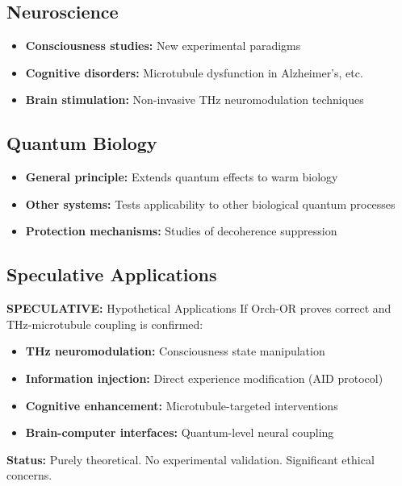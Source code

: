 \subsection{Neuroscience}

\begin{itemize}
\item \textbf{Consciousness studies:} New experimental paradigms
\item \textbf{Cognitive disorders:} Microtubule dysfunction in Alzheimer's, etc.
\item \textbf{Brain stimulation:} Non-invasive THz neuromodulation techniques
\end{itemize}

\subsection{Quantum Biology}

\begin{itemize}
\item \textbf{General principle:} Extends quantum effects to warm biology
\item \textbf{Other systems:} Tests applicability to other biological quantum processes
\item \textbf{Protection mechanisms:} Studies of decoherence suppression
\end{itemize}

\subsection{Speculative Applications}

\begin{calloutbox}[colback=red!5!white,colframe=red!75!black]{\textbf{SPECULATIVE:} Hypothetical Applications}
If Orch-OR proves correct and THz-microtubule coupling is confirmed:
\begin{itemize}
\item \textbf{THz neuromodulation:} Consciousness state manipulation
\item \textbf{Information injection:} Direct experience modification (AID protocol)
\item \textbf{Cognitive enhancement:} Microtubule-targeted interventions
\item \textbf{Brain-computer interfaces:} Quantum-level neural coupling
\end{itemize}

\textbf{Status:} Purely theoretical. No experimental validation. Significant ethical concerns.
\end{calloutbox}

